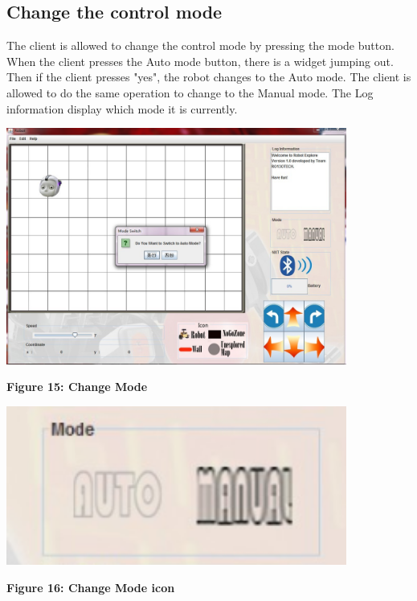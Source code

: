 \documentclass[11pt, a4paper]{report}
\begin{document}
\subsection{Change the control mode}
The client is allowed to change the control mode by pressing the mode button. When the client presses the Auto mode button, there is a widget jumping out. Then if the client presses "yes", the robot changes to the Auto mode. The client is allowed to do the same operation to change to the Manual mode.  The Log information display which mode it is currently.
\begin{center}
 \includegraphics[width=11.20cm]{changemode.jpg}
\end{center}
\begin{center}
\textbf {Figure 15: Change Mode} \\[0.3cm]
\end{center}
\begin{center}
 \includegraphics[width=11.20cm]{changemode2}
\end{center}
\begin{center}
\textbf {Figure 16: Change Mode icon} \\[0.3cm]
\end{center}
\end{document}
